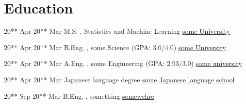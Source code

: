 \documentclass[letterpaper]{DS_class_file} %
\begin{document}
\makeprofile %

\section{Education}

\begin{twenty} %
   	\twentyitem
	    {20** Apr}
	    {20** Mar}
	    {\hspace{0.2cm}M.S. , Statistics and Machine Learning}
	    {\href{https://www.es.osaka-u.ac.jp/en/index.html}{\hspace{0.27cm}some University}}
	    {}
	    {}
\end{twenty}

\begin{twenty} %
   	\twentyitem
	    {20** Apr}
	    {20** Mar}
	    {\hspace{0.2cm}B.Eng. , some Science \textnormal{(GPA: 3.0/4.0)}}
	    {\href{https://www.es.osaka-u.ac.jp/en/index.html}{\hspace{0.27cm}some University}}
	    {}
	    {} 
\end{twenty}

\begin{twenty} %
   	\twentyitem
	    {20** Apr}
	    {20** Mar}
	    {\hspace{0.2cm}A.Eng. , some Engineering \textnormal{(GPA: 2.93/3.0)}}
	    {\href{https://www.es.osaka-u.ac.jp/en/index.html}{\hspace{0.27cm}some university}}
	    {}
	    {} 
\end{twenty}

\begin{twenty} %
   	\twentyitem
	    {20** Apr}
	    {20** Mar}
	    {\hspace{0.2cm}Japanese language degree}
	    {\href{https://www.es.osaka-u.ac.jp/en/index.html}{\hspace{0.27cm}some Japanese language school}}
	    {}
	    {} 
\end{twenty}

\begin{twenty} %
   	\twentyitem
	    {20** Sep}
	    {20** Mar}
	    {\hspace{0.2cm}B.Eng. , something}
	    {\href{https://www.es.osaka-u.ac.jp/en/index.html}{\hspace{0.27cm}somewehre}}
	    {}
	    {} 
\end{twenty}
\end{document}
